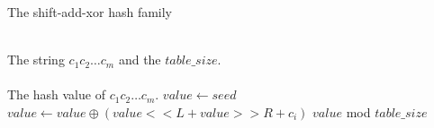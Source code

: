 \documentclass{article}
\begin{document}








\begin{algorithm}
  \caption{The \textsf{shift-add-xor} hash family}\scriptsize
  \label{alg:hash fun}
  \begin{algorithmic}[1]
    \REQUIRE ~~\\
    The string $c_1c_2 \dots c_m$ and the $table\_size$.  \\
    \ENSURE ~~\\
    The hash value of $c_1c_2 \dots c_m$.
    \STATE
    \STATE $value \leftarrow seed$
    \STATE $value \leftarrow value \oplus (value << L + value >> R + c_i)$
    \ENDFOR
    \RETURN $value$ mod $table\_size$
  \end{algorithmic}
\end{algorithm}
\end{document}
